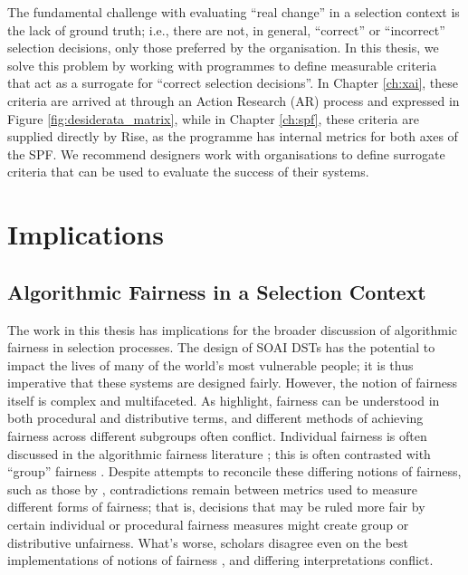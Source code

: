 The fundamental challenge with evaluating ``real change'' in a selection context is the lack of ground truth; i.e., there are not, in general, ``correct'' or ``incorrect'' selection decisions, only those preferred by the organisation. In this thesis, we solve this problem by working with programmes to define measurable criteria that act as a surrogate for ``correct selection decisions''. In Chapter \ref{ch:xai}, these criteria are arrived at through an Action Research (AR) process and expressed in Figure \ref{fig:desiderata_matrix}, while in Chapter \ref{ch:spf}, these criteria are supplied directly by Rise, as the programme has internal metrics for both axes of the SPF. We recommend designers work with organisations to define surrogate criteria that can be used to evaluate the success of their systems.

\section{Implications}
\subsection{Algorithmic Fairness in a Selection Context}\label{ssec:fairness}
The work in this thesis has implications for the broader discussion of algorithmic fairness in selection processes. The design of SOAI DSTs has the potential to impact the lives of many of the world's most vulnerable people; it is thus imperative that these systems are designed fairly. However, the notion of fairness itself is complex and multifaceted. As \textcite{pmlr-v80-kearns18a} highlight, fairness can be understood in both procedural and distributive terms, and different methods of achieving fairness across different subgroups often conflict. Individual fairness is often discussed in the algorithmic fairness literature \cite{dwork_fairness_2012}; this is often contrasted with ``group'' fairness \cite{fleisher_whats_nodate,binns_apparent_2019,barocas2023fairness,Friedler_Scheidegger_Venkatasubramanian_2016}. Despite attempts to reconcile these differing notions of fairness, such as those by \textcite{binns_apparent_2019}, contradictions remain between metrics used to measure different forms of fairness; that is, decisions that may be ruled more fair by certain individual or procedural fairness measures might create group or distributive unfairness. What's worse, scholars disagree even on the best implementations of notions of fairness \cite{Friedler_Scheidegger_Venkatasubramanian_2016,binns_apparent_2019}, and differing interpretations conflict.

